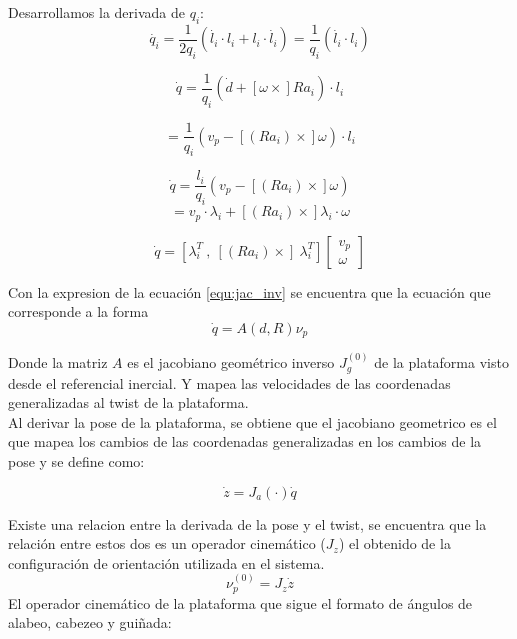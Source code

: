 Desarrollamos la derivada de $q_i$:
\begin{equation}
\dot{q_i} = \frac{1}{2q_i} (\dot{l_i} \cdot l_i + l_i \cdot \dot{l_i}) = \frac{1}{q_i} (\dot{l_i} \cdot l_i)
\end{equation}

\begin{equation}
\dot{q}=\frac{1}{q_i}(\dot{d} + [\omega \times] Ra_i)\cdot l_i 
\end{equation}

\begin{equation*}
= \frac{1}{q_i}(v_p - [(Ra_i)\times]\omega)\cdot l_i
\end{equation*}

\begin{equation}
\dot{q} = \frac{l_i}{q_i}\left( v_p - [(Ra_i)\times]\omega \right) 
\end{equation}
\begin{equation*}
= v_p \cdot \lambda_i + [(Ra_i)\times]\lambda_i \cdot \omega
\end{equation*}

\begin{equation} \label{equ:jac_inv}
\dot{q} = [\lambda_i^T\ ,\ [(Ra_i)\times]\ \lambda_i^T] \begin{bmatrix}
v_p\\
\omega
\end{bmatrix}
\end{equation}

Con la expresion de la ecuación \ref{equ:jac_inv} se encuentra que la ecuación que 
corresponde a la forma
\begin{equation} \label{equ:jac_g}
\dot{q} = A(d,R) \nu_p
\end{equation}

Donde la matriz $A$ es el jacobiano geométrico inverso $J_g^{(0)}$ de la plataforma visto desde el referencial inercial. Y mapea las velocidades de las coordenadas generalizadas al twist de la plataforma.\\

Al derivar la pose de la plataforma, se obtiene que el jacobiano geometrico es el que mapea los cambios de las coordenadas generalizadas en los cambios de la pose y se define como:

\begin{equation} \label{equ:jac_a}
\dot{z} = J_a(\cdot)\dot{q}
\end{equation}

Existe una relacion entre la derivada de la pose y el twist, se encuentra que la relación entre estos dos es un operador cinemático ($J_z$) el obtenido de la configuración de orientación utilizada en el sistema.\\
\begin{equation}
\nu_p^{(0)} = J_z\dot{z}
\end{equation}
El operador cinemático de la plataforma que sigue el formato de ángulos de alabeo, cabezeo y guiñada:


